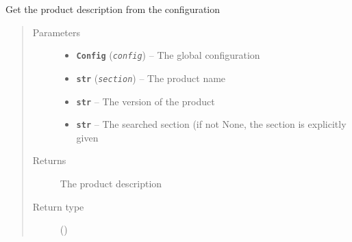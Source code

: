 \documentclass[a4paper,10pt,english]{sphinxmanual}
\begin{document}
\begin{fulllineitems}
\label{commands/apidoc/src:src.product.get_product_section}
Get the product description from the configuration
\begin{quote}\begin{description}
\item[{Parameters}] \leavevmode\begin{itemize}
\item {} 
\textbf{\texttt{Config}} (\emph{\texttt{config}}) -- The global configuration

\item {} 
\textbf{\texttt{str}} (\emph{\texttt{section}}) -- The product name

\item {} 
\textbf{\texttt{str}} -- The version of the product

\item {} 
\textbf{\texttt{str}} -- The searched section (if not None, the section is 
explicitly given

\end{itemize}

\item[{Returns}] \leavevmode
The product description

\item[{Return type}] \leavevmode
{\hyperref[commands/apidoc/src:src.pyconf.Config]{}} ()

\end{description}\end{quote}

\end{fulllineitems}

\end{document}
